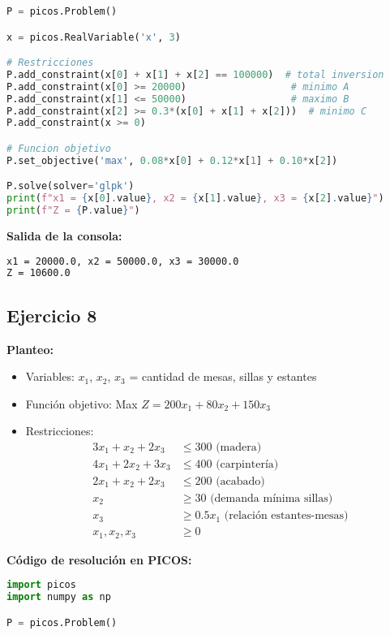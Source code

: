 \documentclass[12pt]{article}
\begin{document}
\begin{enumerate}
\begin{lstlisting}[language=Python]
P = picos.Problem()

x = picos.RealVariable('x', 3)

# Restricciones
P.add_constraint(x[0] + x[1] + x[2] == 100000)  # total inversion
P.add_constraint(x[0] >= 20000)                  # minimo A
P.add_constraint(x[1] <= 50000)                  # maximo B
P.add_constraint(x[2] >= 0.3*(x[0] + x[1] + x[2]))  # minimo C
P.add_constraint(x >= 0)

# Funcion objetivo
P.set_objective('max', 0.08*x[0] + 0.12*x[1] + 0.10*x[2])

P.solve(solver='glpk')
print(f"x1 = {x[0].value}, x2 = {x[1].value}, x3 = {x[2].value}")
print(f"Z = {P.value}")
\end{lstlisting}

\textbf{Salida de la consola:}
\begin{lstlisting}[language=bash,backgroundcolor=\color{black},basicstyle=\color{white}\ttfamily,numbers=none]
x1 = 20000.0, x2 = 50000.0, x3 = 30000.0
Z = 10600.0
\end{lstlisting}

\subsection*{Ejercicio 8}

\textbf{Planteo:}
\begin{itemize}
\item Variables: $x_1$, $x_2$, $x_3$ = cantidad de mesas, sillas y estantes
\item Función objetivo: Max $Z = 200x_1 + 80x_2 + 150x_3$
\item Restricciones:
  \begin{align*}
  3x_1 + x_2 + 2x_3 &\leq 300 \text{ (madera)} \\
  4x_1 + 2x_2 + 3x_3 &\leq 400 \text{ (carpintería)} \\
  2x_1 + x_2 + 2x_3 &\leq 200 \text{ (acabado)} \\
  x_2 &\geq 30 \text{ (demanda mínima sillas)} \\
  x_3 &\geq 0.5x_1 \text{ (relación estantes-mesas)} \\
  x_1, x_2, x_3 &\geq 0
  \end{align*}
\end{itemize}

\textbf{Código de resolución en PICOS:}
\begin{lstlisting}[language=Python]
import picos
import numpy as np

P = picos.Problem()


\end{lstlisting}
\end{enumerate}
\end{document}

